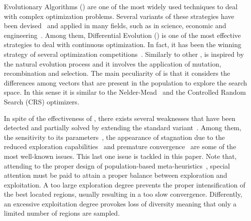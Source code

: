 Evolutionary Algorithms (\EAS{}) are one of the most widely used techniques to deal with complex optimization problems.
%
Several variants of these strategies have been devised~\cite{Talbi:09} and applied in many fields, such as in science, 
economic and engineering~\cite{chakraborty2008advances}.
%
Among them, Differential Evolution (\DE{}) \cite{storn1997differential} is one of the most effective strategies to deal
with continuous optimization.
%
In fact, it has been the winning strategy of several optimization competitions~\cite{das2011differential}.
%
Similarly to other \EAS{}, \DE{} is inspired by the natural evolution process and it involves the application of mutation, recombination and 
selection.
%
The main peculiarity of \DE{} is that it considers the differences among vectors that are present in the population to explore the search space.
%
In this sense it is similar to the Nelder-Mead~\cite{nelder1965simplex} and the 
Controlled Random Search (CRS) \cite{price1983global} optimizers.

In spite of the effectiveness of \DE{}, there exists several weaknesses that have been detected and partially
solved by extending the standard variant~\cite{das2011differential}.
%
Among them, the sensitivity to its parameters~\cite{zhang2009jade}, the appearance of stagnation due to the reduced exploration 
capabilities~\cite{sa2008exploration,lampinen2000stagnation} and premature convergence~\cite{zaharie2003control} are some of the most well-known
issues.
%
This last one issue is tackled in this paper.
%
Note that, attending to the proper design of population-based meta-heuristics~\cite{Talbi:09}, special attention must be
paid to attain a proper balance between exploration and exploitation.
%
A too large exploration degree prevents the proper intensification of the best located regions, usually resulting in a
too slow convergence.
%
Differently, an excessive exploitation degree provokes loss of diversity meaning that only a limited number of regions are sampled.

